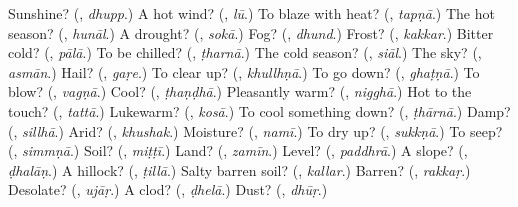 \begin{tcolorbox}[breakable,colback=teal!4,colframe=teal!35!black,title={Before you move on}]
Sunshine? (\textbf{}, \emph{dhupp}.) A hot wind? (\textbf{}, \emph{lū}.) To blaze with heat? (\textbf{}, \emph{tapṇā}.) The hot season? (\textbf{}, \emph{hunāl}.) A drought? (\textbf{}, \emph{sokā}.) Fog? (\textbf{}, \emph{dhund}.) Frost? (\textbf{}, \emph{kakkar}.) Bitter cold? (\textbf{}, \emph{pālā}.) To be chilled? (\textbf{}, \emph{ṭharnā}.) The cold season? (\textbf{}, \emph{siāl}.) The sky? (\textbf{}, \emph{asmān}.) Hail? (\textbf{}, \emph{gaṛe}.) To clear up? (\textbf{}, \emph{khullhṇā}.) To go down? (\textbf{}, \emph{ghaṭṇā}.) To blow? (\textbf{}, \emph{vagṇā}.) Cool? (\textbf{}, \emph{ṭhaṇḍhā}.) Pleasantly warm? (\textbf{}, \emph{nigghā}.) Hot to the touch? (\textbf{}, \emph{tattā}.) Lukewarm? (\textbf{}, \emph{kosā}.) To cool something down? (\textbf{}, \emph{ṭhārnā}.) Damp? (\textbf{}, \emph{sillhā}.) Arid? (\textbf{}, \emph{khushak}.) Moisture? (\textbf{}, \emph{namī}.) To dry up? (\textbf{}, \emph{sukkṇā}.) To seep? (\textbf{}, \emph{simmṇā}.) Soil? (\textbf{}, \emph{miṭṭī}.) Land? (\textbf{}, \emph{zamīn}.) Level? (\textbf{}, \emph{paddhrā}.) A slope? (\textbf{}, \emph{ḍhalāṇ}.) A hillock? (\textbf{}, \emph{ṭillā}.) Salty barren soil? (\textbf{}, \emph{kallar}.) Barren? (\textbf{}, \emph{rakkaṛ}.) Desolate? (\textbf{}, \emph{ujāṛ}.) A clod? (\textbf{}, \emph{ḍhelā}.) Dust? (\textbf{}, \emph{dhūṛ}.)
\end{tcolorbox}
